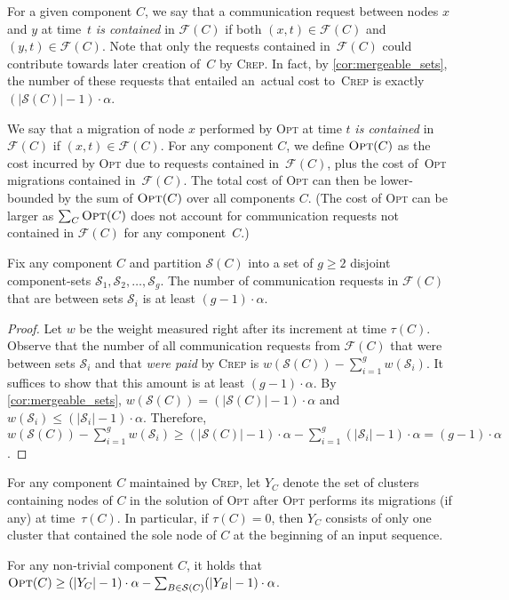 \documentclass{siamart190516}
\newcommand{\OPT}{\textsc{Opt}\xspace}
\newcommand{\CREP}{\textsc{Crep}\xspace}
\newcommand{\set}{\mathcal{S}}
\newcommand{\F}{\mathcal{F}}
\begin{document}
For a given component $C$, we say that a communication request between nodes
$x$ and $y$ at time~$t$ \emph{is contained} in $\F(C)$ if both $(x,t) \in \F(C)$
and $(y,t) \in \F(C)$. Note that only the requests contained in~$\F(C)$
could contribute towards later creation of~$C$ by \CREP. In fact, by
\cref{cor:mergeable_sets}, the number of these requests that
entailed an~actual cost to~\CREP is exactly $(|\set(C)| - 1) \cdot \alpha$.

We say that a migration of node $x$ performed by \OPT at time $t$ \emph{is
contained} in~$\F(C)$ if $(x,t) \in \F(C)$. For any component $C$, we define
$\OPT(C)$ as the cost incurred by \OPT due to requests contained in~$\F(C)$, 
plus the cost of~\OPT migrations contained in~$\F(C)$. The total cost of \OPT
can then be lower-bounded by the sum of $\OPT(C)$ over all components $C$.
(The cost of \OPT can be larger as $\sum_C \OPT(C)$ does not account for 
communication requests not contained in $\F(C)$ for any component~$C$.)

\begin{lemma}
\label{lem:merge_action_cut}
Fix any component $C$ and partition $\set(C)$ into a set of $g \geq 2$ disjoint
component-sets $\set_1, \set_2, \ldots, \set_g$. The number of communication requests
in $\F(C)$ that are between sets $\set_i$ is at least $(g-1) \cdot \alpha$.
\end{lemma}

\begin{proof}
Let $w$ be the weight measured right after its increment at time $\tau(C)$.
Observe that the number of all communication requests from $\F(C)$ that were
between sets $\set_i$ and that \emph{were paid} by \CREP is $w(\set(C)) -
\sum_{i=1}^g w(\set_i)$. It suffices to show that this amount is at least $(g-1)
\cdot \alpha$. By \cref{cor:mergeable_sets}, $w(\set(C)) = (|\set(C)|-1)
\cdot \alpha$ and $w(\set_i) \leq (|\set_i|-1) \cdot \alpha$. Therefore, $w(\set(C)) -
\sum_{i=1}^g w(\set_i) \geq (|\set(C)|-1) \cdot \alpha - \sum_{i=1}^g (|\set_i|-1)
\cdot \alpha = (g-1) \cdot \alpha$.
\end{proof}

For any component $C$ maintained by \CREP, let $Y_C$ denote the set of clusters
containing nodes of $C$ in the solution of \OPT after \OPT performs its
migrations (if any) at time~$\tau(C)$. In particular, if $\tau(C) = 0$, then
$Y_C$ consists of only one cluster that contained the sole node of $C$ 
at the beginning of an input sequence.

\begin{lemma}
\label{lem:opt_recursive_bound}
For any non-trivial component $C$, it holds that $\OPT(C) \geq (|Y_C| - 1)
\cdot \alpha - \sum_{B \in \set(C)} (|Y_B| - 1) \cdot \alpha$.
\end{lemma}
\end{document}
